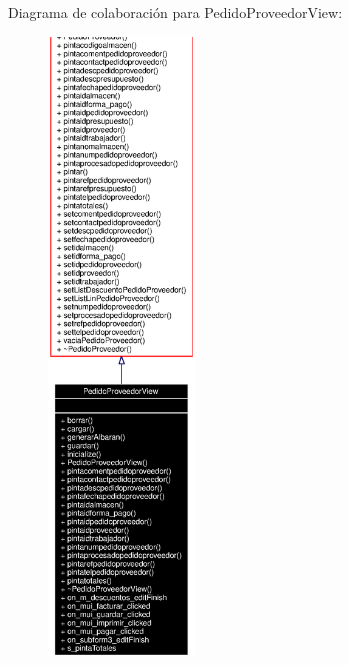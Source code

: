 Diagrama de colaboraci\'{o}n para Pedido\-Proveedor\-View:\begin{figure}[H]
\begin{center}
\leavevmode
\includegraphics[width=110pt]{classPedidoProveedorView__coll__graph}
\end{center}
\end{figure}
